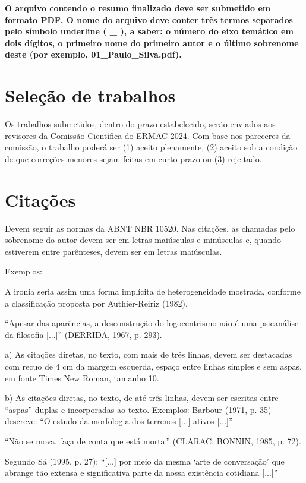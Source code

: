 \documentclass[a4paper,11pt]{article}
\begin{document}
{\bf O arquivo contendo o resumo finalizado deve ser submetido em formato PDF. O nome do arquivo deve conter três termos separados pelo símbolo underline ( \_ ), a saber: o número do eixo temático em dois dígitos, o primeiro nome do primeiro autor e o último sobrenome deste (por exemplo, 01\_Paulo\_Silva.pdf).}

\section*{Seleção de trabalhos}
\quad
\justifying
 Os trabalhos submetidos, dentro do prazo estabelecido, serão enviados aos revisores da Comissão Científica do ERMAC 2024. Com base nos pareceres da comissão, o trabalho poderá ser (1) aceito plenamente, (2) aceito sob a condição de que correções menores sejam feitas em curto prazo ou (3) rejeitado.


\section*{Citações}
Devem seguir as normas da ABNT NBR 10520. Nas citações, as chamadas pelo sobrenome do autor devem ser em letras maiúsculas e minúsculas e, quando estiverem entre parênteses, devem ser em letras maiúsculas.

Exemplos:

A ironia seria assim uma forma implícita de heterogeneidade mostrada, conforme a classificação proposta por Authier-Reiriz (1982).

\vskip 0.2cm
``Apesar das aparências, a desconstrução do logocentrismo não é uma psicanálise da filosofia [...]'' (DERRIDA, 1967, p. 293).

\vskip 0.2cm
a) As citações diretas, no texto, com mais de três linhas, devem ser destacadas com recuo de 4 cm da margem esquerda, espaço entre linhas simples e sem aspas, em fonte Times New Roman, tamanho 10.


\vskip 0.2cm
b) As citações diretas, no texto, de até três linhas, devem ser escritas entre ``aspas'' duplas e incorporadas ao texto.
Exemplos:
Barbour (1971, p. 35) descreve: ``O estudo da morfologia dos terrenos [...] ativos [...]''

\vskip 0.2cm
``Não se mova, faça de conta que está morta.'' (CLARAC; BONNIN, 1985, p. 72).

\vskip 0.2cm
Segundo Sá (1995, p. 27): ``[...] por meio da mesma `arte de conversação' que abrange tão extensa e significativa parte da nossa existência cotidiana [...]''
\end{document}
